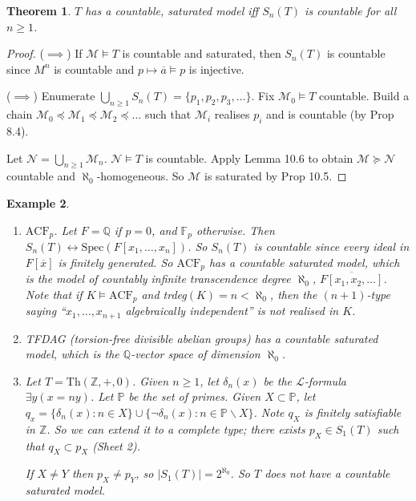 \documentclass[]{article}
\theoremstyle{custhm}
\newtheorem{theorem}{Theorem}[section]
\theoremstyle{cusdef}
\theoremstyle{custhm}
\theoremstyle{custhm}
\theoremstyle{custhm}
\theoremstyle{ex}
\newtheorem{ex}[theorem]{Example}
\theoremstyle{custhm}
\theoremstyle{cusdef}
\theoremstyle{remark}
\theoremstyle{remark}
\newcommand{\Z}{\mathbb{Z}}
\newcommand{\Q}{\mathbb{Q}}
\renewcommand{\L}{\mathcal{L}}
\newcommand{\M}{\mathcal{M}}
\renewcommand{\bar}{\overline}
\newcommand{\Th}{\textrm{Th}}
\newcommand{\N}{\mathcal{N}}
\newcommand{\acf}{\textrm{ACF}}
\newcommand{\F}{\mathbb{F}}
\begin{document}
\begin{theorem}
$T$ has a countable, saturated model iff $S_n(T)$ is countable for all $n\ge1$.
\end{theorem}
\begin{proof}
($\implies$) If $\M\models T$ is countable and saturated, then $S_n(T)$ is countable since $M^n$ is countable and $p\mapsto \bar{a}\models p$ is injective.

($\implies$) Enumerate $\bigcup_{n\ge 1}S_n(T) = \{p_1,p_2,p_3,\dots\}$. Fix $\M_0\models T$ countable. Build a chain $\M_0\preceq\M_1\preceq\M_2\preceq\dots$ such that $\M_i$ realises $p_i$ and is countable (by Prop 8.4).

Let $\N = \bigcup_{n\ge 1}\M_n$. $\N\models T$ is countable. Apply Lemma 10.6 to obtain $\M\succeq \N$ countable and $\aleph_0$-homogeneous. So $\M$ is saturated by Prop 10.5.
\end{proof}

\begin{ex}\ 
\begin{enumerate}[label=(\arabic*)]
	\item $\acf_p$. Let $F = \Q$ if $p = 0$, and $\F_p$ otherwise. Then $S_n(T)\leftrightarrow \textrm{Spec}(F[x_1,\dots,x_n])$. So $S_n(T)$ is countable since every ideal in $F[\bar{x}]$ is finitely generated. So $\acf_p$ has a countable saturated model, which is the model of countably infinite transcendence degree $\aleph_0$, $\overline{F[x_1,x_2,\dots]}$. Note that if $K\models \acf_p$ and trdeg$(K) = n < \aleph_0$, then the $(n+1)$-type saying ``$x_1,\dots,x_{n+1}$ algebraically independent'' is not realised in $K$.
	
	\item TFDAG (torsion-free divisible abelian groups) has a countable saturated model, which is the $\Q$-vector space of dimension $\aleph_0$.
	
	\item Let $T = \Th(\Z,+,0)$. Given $n\ge 1$, let $\delta_n(x)$ be the $\L$-formula $\exists y(x = ny)$. Let $\mathbb{P}$ be the set of primes. Given $X\subset \mathbb{P}$, let $q_x = \{\delta_n(x):n\in X\}\cup\{\neg\delta_n(x):n\in \mathbb{P}\backslash X\}$. Note $q_X$ is finitely satisfiable in $\Z$. So we can extend it to a complete type; there exists $p_X \in S_1(T)$ such that $q_X \subset p_X$ (Sheet 2).
	
	If $X \ne Y$ then $p_X \ne p_Y$, so $|S_1(T)| = 2^{\aleph_0}$. So $T$ does not have a countable saturated model.
\end{enumerate}
\end{ex}
\end{document}

